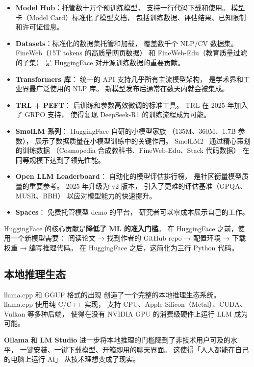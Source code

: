 \begin{itemize}[noitemsep]
  \item \textbf{Model Hub}：托管数十万个预训练模型，
        支持一行代码下载和使用。
        模型卡（Model Card）标准化了模型文档，
        包括训练数据、评估结果、已知限制和许可证信息。
  \item \textbf{Datasets}：标准化的数据集托管和加载，
        覆盖数千个 NLP/CV 数据集。
        FineWeb（15T tokens 的高质量网页数据）
        和 FineWeb-Edu（教育质量过滤的子集）
        是 HuggingFace 对开源训练数据的重要贡献。
  \item \textbf{Transformers 库}：
        统一的 API 支持几乎所有主流模型架构，
        是学术界和工业界最广泛使用的 NLP 库。
        新模型发布后通常在数天内就会被集成。
  \item \textbf{TRL + PEFT}：
        后训练和参数高效微调的标准工具。
        TRL 在 2025 年加入了 GRPO 支持，
        使得复现 DeepSeek-R1 的训练流程成为可能。
  \item \textbf{SmolLM 系列}：
        HuggingFace 自研的小模型家族
        （135M、360M、1.7B 参数），
        展示了数据质量在小模型训练中的关键作用。
        SmolLM2~\cite{allal2025smollm2} 通过精心策划的训练数据
        （Cosmopedia 合成教科书、FineWeb-Edu、Stack 代码数据）
        在同等规模下达到了领先性能。
  \item \textbf{Open LLM Leaderboard}：
        自动化的模型评估排行榜，
        是社区衡量模型质量的重要参考。
        2025 年升级为 v2 版本，
        引入了更难的评估基准（GPQA、MUSR、BBH）
        以应对模型能力的快速提升。
  \item \textbf{Spaces}：
        免费托管模型 demo 的平台，
        研究者可以零成本展示自己的工作。
\end{itemize}

HuggingFace 的核心贡献是\textbf{降低了 ML 的准入门槛}。
在 HuggingFace 之前，使用一个新模型需要：
阅读论文 → 找到作者的 GitHub repo → 配置环境 → 下载权重
→ 编写推理代码。
在 HuggingFace 之后，这简化为三行 Python 代码。

\subsection{本地推理生态}

llama.cpp 和 GGUF 格式的出现
创造了一个完整的本地推理生态系统。
llama.cpp 使用纯 C/C++ 实现，
支持 CPU、Apple Silicon（Metal）、CUDA、Vulkan 等多种后端，
使得在没有 NVIDIA GPU 的消费级硬件上运行 LLM 成为可能。

\textbf{Ollama} 和 \textbf{LM Studio}
进一步将本地推理的门槛降到了非技术用户可及的水平，
一键安装、一键下载模型、开箱即用的聊天界面。
这使得「人人都能在自己的电脑上运行 AI」
从技术理想变成了现实。


